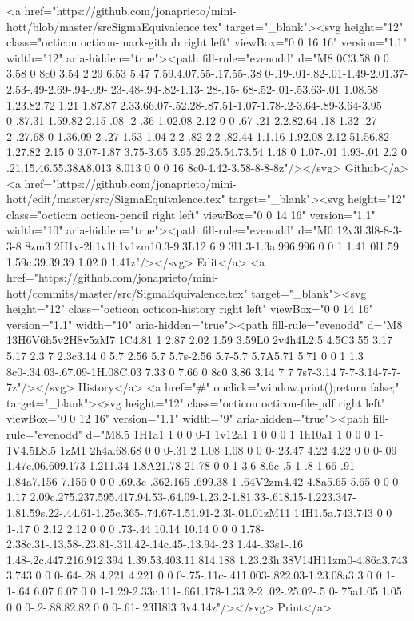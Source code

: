       <a href="https://github.com/jonaprieto/mini-hott/blob/master/srcSigmaEquivalence.tex" target="_blank"><svg height="12" class="octicon octicon-mark-github right left" viewBox="0 0 16 16" version="1.1" width="12" aria-hidden="true"><path fill-rule="evenodd" d="M8 0C3.58 0 0 3.58 0 8c0 3.54 2.29 6.53 5.47 7.59.4.07.55-.17.55-.38 0-.19-.01-.82-.01-1.49-2.01.37-2.53-.49-2.69-.94-.09-.23-.48-.94-.82-1.13-.28-.15-.68-.52-.01-.53.63-.01 1.08.58 1.23.82.72 1.21 1.87.87 2.33.66.07-.52.28-.87.51-1.07-1.78-.2-3.64-.89-3.64-3.95 0-.87.31-1.59.82-2.15-.08-.2-.36-1.02.08-2.12 0 0 .67-.21 2.2.82.64-.18 1.32-.27 2-.27.68 0 1.36.09 2 .27 1.53-1.04 2.2-.82 2.2-.82.44 1.1.16 1.92.08 2.12.51.56.82 1.27.82 2.15 0 3.07-1.87 3.75-3.65 3.95.29.25.54.73.54 1.48 0 1.07-.01 1.93-.01 2.2 0 .21.15.46.55.38A8.013 8.013 0 0 0 16 8c0-4.42-3.58-8-8-8z"/></svg> Github</a>
      <a href="https://github.com/jonaprieto/mini-hott/edit/master/src/SigmaEquivalence.tex" target="_blank"><svg height="12" class="octicon octicon-pencil right left" viewBox="0 0 14 16" version="1.1" width="10" aria-hidden="true"><path fill-rule="evenodd" d="M0 12v3h3l8-8-3-3-8 8zm3 2H1v-2h1v1h1v1zm10.3-9.3L12 6 9 3l1.3-1.3a.996.996 0 0 1 1.41 0l1.59 1.59c.39.39.39 1.02 0 1.41z"/></svg> Edit</a>
      <a href="https://github.com/jonaprieto/mini-hott/commits/master/src/SigmaEquivalence.tex" target="_blank"><svg height="12" class="octicon octicon-history right left" viewBox="0 0 14 16" version="1.1" width="10" aria-hidden="true"><path fill-rule="evenodd" d="M8 13H6V6h5v2H8v5zM7 1C4.81 1 2.87 2.02 1.59 3.59L0 2v4h4L2.5 4.5C3.55 3.17 5.17 2.3 7 2.3c3.14 0 5.7 2.56 5.7 5.7s-2.56 5.7-5.7 5.7A5.71 5.71 0 0 1 1.3 8c0-.34.03-.67.09-1H.08C.03 7.33 0 7.66 0 8c0 3.86 3.14 7 7 7s7-3.14 7-7-3.14-7-7-7z"/></svg> History</a>
      <a  href="#" onclick="window.print();return false;" target="_blank"><svg height="12" class="octicon octicon-file-pdf right left" viewBox="0 0 12 16" version="1.1" width="9" aria-hidden="true"><path fill-rule="evenodd" d="M8.5 1H1a1 1 0 0 0-1 1v12a1 1 0 0 0 1 1h10a1 1 0 0 0 1-1V4.5L8.5 1zM1 2h4a.68.68 0 0 0-.31.2 1.08 1.08 0 0 0-.23.47 4.22 4.22 0 0 0-.09 1.47c.06.609.173 1.211.34 1.8A21.78 21.78 0 0 1 3.6 8.6c-.5 1-.8 1.66-.91 1.84a7.156 7.156 0 0 0-.69.3c-.362.165-.699.38-1 .64V2zm4.42 4.8a5.65 5.65 0 0 0 1.17 2.09c.275.237.595.417.94.53-.64.09-1.23.2-1.81.33-.618.15-1.223.347-1.81.59s.22-.44.61-1.25c.365-.74.67-1.51.91-2.3l-.01.01zM11 14H1.5a.743.743 0 0 1-.17 0 2.12 2.12 0 0 0 .73-.44 10.14 10.14 0 0 0 1.78-2.38c.31-.13.58-.23.81-.31l.42-.14c.45-.13.94-.23 1.44-.33s1-.16 1.48-.2c.447.216.912.394 1.39.53.403.11.814.188 1.23.23h.38V14H11zm0-4.86a3.743 3.743 0 0 0-.64-.28 4.221 4.221 0 0 0-.75-.11c-.411.003-.822.03-1.23.08a3 3 0 0 1-1-.64 6.07 6.07 0 0 1-1.29-2.33c.111-.661.178-1.33.2-2 .02-.25.02-.5 0-.75a1.05 1.05 0 0 0-.2-.88.82.82 0 0 0-.61-.23H8l3 3v4.14z"/></svg> Print</a>
